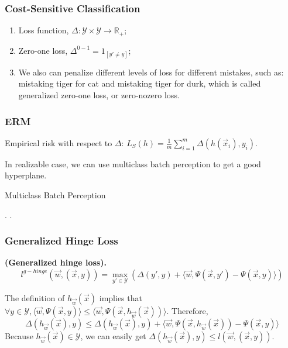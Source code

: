 \subsubsection{Cost-Sensitive Classification}%

\begin{enumerate}
    \item Loss function, $ \Delta: \mathcal{Y} \times \mathcal{Y} \rightarrow \mathbb{R}_+ $;
    \item Zero-one loss, $ \Delta^{0-1} = 1_{[y' \ne y]} $;
    \item We also can penalize different levels of loss for different mistakes, such as: mistaking tiger for cat and mistaking tiger for durk, which is called generalized zero-one loss, or zero-nozero loss.
\end{enumerate}

\subsubsection{ERM}%
Empirical risk with respect to $ \Delta $: $ L_S(h) = \frac{1}{m} \sum^{m}_{i=1} \Delta(h(\vec{x}_i), y_i). $

In realizable case, we can use multiclass batch perception to get a good hyperplane.
\begin{algorithm}[H]
    \caption{Multiclass Batch Perception}
    \begin{algorithmic}
        \Else{}
        \EndIf.
        \EndFor.
    \end{algorithmic}
\end{algorithm}

\subsubsection{Generalized Hinge Loss}%
\begin{definition}
    \textbf{(Generalized hinge loss).}
    \[
        l^{g-hinge}(\vec{w}, (\vec{x}, y)) = \max_{y' \in \mathcal{Y}} (\Delta(y', y) + \langle \vec{w}, \Psi(\vec{x}, y') - \Psi(\vec{x}, y) \rangle)
    \]
\end{definition}
The definition of $ h_{\vec{w}}(\vec{x}) $ implies that $ \forall y \in \mathcal{Y}, \langle \vec{w}, \Psi(\vec{x}, y) \rangle \le \langle \vec{w}, \Psi(\vec{x}, h_{\vec{w}}(\vec{x})) \rangle. $ Therefore,
\[
    \Delta(h_{\vec{w}}(\vec{x}), y) \le \Delta(h_{\vec{w}}(\vec{x}), y) + \langle \vec{w}, \Psi(\vec{x}, h_{\vec{w}}(\vec{x})) - \Psi(\vec{x}, y) \rangle
\]
Because $ h_{\vec{w}}(\vec{x}) \in \mathcal{Y} $, we can easily get $ \Delta(h_{\vec{w}}(\vec{x}), y) \le l(\vec{w}, (\vec{x}, y)) $.

